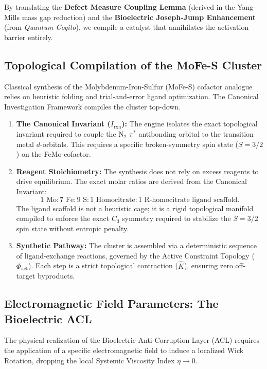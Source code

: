 \documentclass[11pt,openany]{extbook}
\theoremstyle{plain}
\theoremstyle{definition}
\begin{document}
By translating the \textbf{Defect Measure Coupling Lemma} (derived in the Yang-Mills mass gap reduction) and the \textbf{Bioelectric Joseph-Jump Enhancement} (from \textit{Quantum Cogito}), we compile a catalyst that annihilates the activation barrier entirely.

\subsection{Topological Compilation of the MoFe-S Cluster}
Classical synthesis of the Molybdenum-Iron-Sulfur (MoFe-S) cofactor analogue relies on heuristic folding and trial-and-error ligand optimization. The Canonical Investigation Framework compiles the cluster top-down.

\begin{enumerate}
    \item \textbf{The Canonical Invariant ($I_{\text{rxn}}$):} The engine isolates the exact topological invariant required to couple the $\text{N}_2$ $\pi^*$ antibonding orbital to the transition metal $d$-orbitals. This requires a specific broken-symmetry spin state ($S = 3/2$) on the FeMo-cofactor.
    \item \textbf{Reagent Stoichiometry:} The synthesis does not rely on excess reagents to drive equilibrium. The exact molar ratios are derived from the Canonical Invariant:
    \[
    1\text{ Mo} : 7\text{ Fe} : 9\text{ S} : 1\text{ Homocitrate} : 1\text{ R-homocitrate ligand scaffold}.
    \]
    The ligand scaffold is not a heuristic cage; it is a rigid topological manifold compiled to enforce the exact $C_3$ symmetry required to stabilize the $S=3/2$ spin state without entropic penalty.
    \item \textbf{Synthetic Pathway:} The cluster is assembled via a deterministic sequence of ligand-exchange reactions, governed by the Active Constraint Topology ($\Phi_{\text{act}}$). Each step is a strict topological contraction ($\hat{K}$), ensuring zero off-target byproducts.
\end{enumerate}

\subsection{Electromagnetic Field Parameters: The Bioelectric ACL}
The physical realization of the Bioelectric Anti-Corruption Layer (ACL) requires the application of a specific electromagnetic field to induce a localized Wick Rotation, dropping the local Systemic Viscosity Index $\eta \to 0$.
\end{document}
